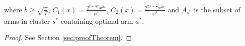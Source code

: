 \begin{theorem}
where $b\geq \sqrt{\frac{e}{T}}$, $C_1(x) = \frac{2^{1+4x}x^{2x}}{\psi^{x}}$, $C_2(x) = \frac{2^{2x+\frac{3}{2}}x^{2x}}{\psi^{x}}$ and $A_{s^{*}}$ is the subset of arms in cluster $s^{*}$ containing optimal arm $a^{*}$.
\end{theorem}
\begin{proof}
 See Section \ref{sec:proofTheorem}.
\end{proof}

	

